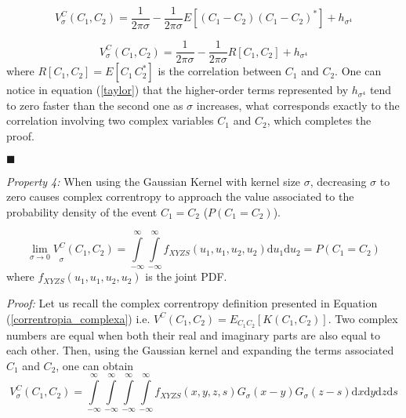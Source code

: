 \documentclass[preprint,12pt]{elsarticle}
\begin{document}
\begin{equation}
V_{\sigma}^C(C_1,C_2) = \frac{1}{2\pi\sigma}   - \frac{1}{2\pi\sigma} E[(C_1 - C_2)(C_1-C_2)^* ]  + h_{\sigma^4}
\end{equation}

\begin{equation}
V_{\sigma}^C(C_1,C_2) = \frac{1}{2\pi\sigma}   - \frac{1}{2\pi\sigma} R[C_1,C_2]  + h_{\sigma^4}
\end{equation}
where $R[C_1,C_2] = E[C_1\,C_2^*]$ is the correlation between $C_1$ and $C_2$. 
One can notice in equation (\ref{taylor}) that the higher-order terms represented by $h_{\sigma^4}$ tend to zero faster than the second one as $\sigma$ increases, what corresponds exactly to the correlation involving two complex variables $C_1$ and $C_2$, which completes the proof.


\begin{flushright}
$\blacksquare$
\end{flushright}





\newcommand{\limit}[3]
{\ensuremath{\lim_{#1 \rightarrow #2} #3}}

\bigskip
\textit{Property 4:} When using the Gaussian Kernel with kernel size $\sigma$, decreasing $\sigma$ to zero causes complex correntropy to approach the value associated to the probability density of the event $C_1=C_2$ ($P(C_1=C_2)$). %

\begin{equation}
\limit{\sigma}{0} V^{C}_{\sigma}(C_{1}, C_{2}) = \int\limits_{-\infty}^{\infty} \int\limits_{-\infty}^{\infty} f_{XYZS}(u_1,u_1,u_2,u_2) \mathrm{d}u_1\mathrm{d}u_2 = P(C_1 = C_2)
\end{equation}
where $f_{XYZS}(u_1,u_1,u_2,u_2)$ is the joint PDF.





\textit{Proof:} 
Let us recall the complex correntropy definition presented in Equation (\ref{correntropia_complexa}) i.e. $V^{C}(C_{1},C_{2}) =  E_{C_{1}C_{2}}[ K(C_{1},C_{2}) ]$. Two complex numbers are equal when both their real and imaginary parts are also equal to each other. Then, using the Gaussian kernel and expanding the terms associated $C_1$ and $C_2$, one can obtain
\begin{equation}
V^{C}_{\sigma}(C_{1}, C_{2}) = \int\limits_{-\infty}^{\infty} \int\limits_{-\infty}^{\infty} \int\limits_{-\infty}^{\infty} \int\limits_{-\infty}^{\infty} f_{XYZS}(x,y,z,s) G_{\sigma}(x-y) G_{\sigma}(z-s) \mathrm{d}x\mathrm{d}y \mathrm{d}z\mathrm{d}s
\end{equation}
\end{document}
